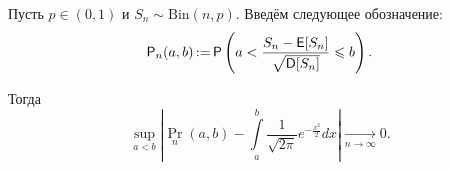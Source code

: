 \begin{itemize}
        \begin{theorem}
           Пусть \(p \in (0, 1)\) и \(S_n \sim \mathrm{Bin}(n, p)\). Введём следующее обозначение:
           \[\Pr_n(a,b)\mathop{:=} \Pr\left( a < \frac{S_n - \E[S_n]}{\sqrt{\D[S_n]}} \leq b \right).\]
           
           Тогда
           \[
           \sup_{a<b} \left|\Pr_n(a, b) - \int\limits_a^b\frac{1}{\sqrt{2\pi}}e^{-\frac{x^{2}}{2}}dx\right| \xrightarrow[n\to\infty]{} 0.
           \]
        \end{theorem}

\end{itemize}
